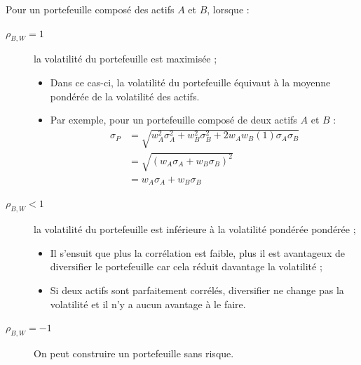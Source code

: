 \documentclass[10pt, french]{article}
\begin{document}
\begin{multicols*}{2}
\begin{center}
\end{center}

Pour un portefeuille composé des actifs $A$ et $B$, lorsque :
\begin{description}
	\item[$\rho_{B, W} = 1$]	la volatilité du portefeuille est maximisée ;
		\begin{itemize}
		\item	Dans ce cas-ci, la volatilité du portefeuille équivaut à la moyenne pondérée de la volatilité des actifs.
		\item	Par exemple, pour un portefeuille composé de deux actifs $A$ et $B$ :
			\begin{align*}
					\sigma_{P}
					&=	\sqrt{w_{A}^{2} \sigma_{A}^{2} + w_{B}^{2} \sigma_{B}^{2} + 2 w_{A} w_{B} (1) \sigma_{A} \sigma_{B}}	\\
					&=	\sqrt{(w_{A} \sigma_{A} + w_{B} \sigma_{B})^{2}}	\\
					&=	w_{A} \sigma_{A} + w_{B} \sigma_{B}
			\end{align*}
		\end{itemize}
	\item[$\rho_{B, W} < 1$]	la volatilité du portefeuille est inférieure à la volatilité pondérée pondérée ;
		\begin{itemize}
		\item	Il s'ensuit que plus la corrélation est faible, plus il est avantageux de diversifier le portefeuille car cela réduit davantage la volatilité ;
		\item	Si deux actifs sont parfaitement corrélés, diversifier ne change pas la volatilité et il n'y a aucun avantage à le faire.
		\end{itemize}
	\item[$\rho_{B, W} = -1$]	On peut construire un portefeuille \textcolor{amethyst}{sans risque}.
\end{description}


\end{multicols*}
\end{document}

